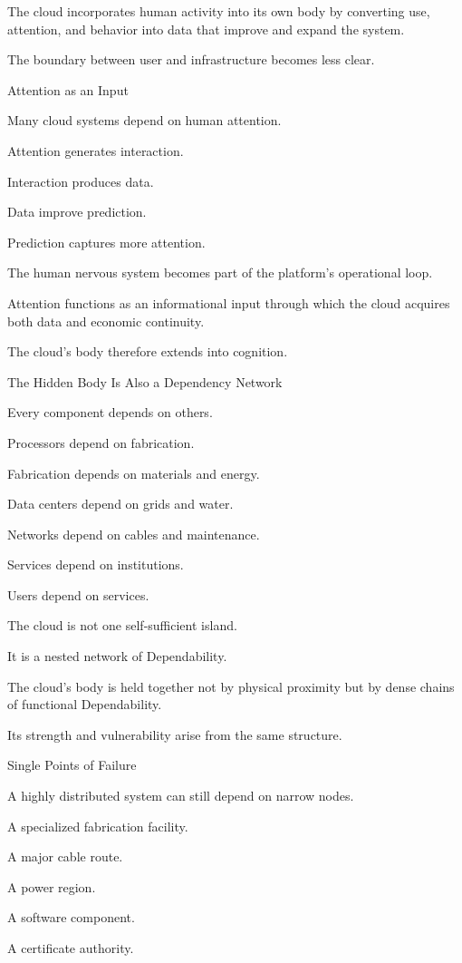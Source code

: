 The cloud incorporates human activity into its own body by converting use, attention, and behavior into data that improve and expand the system.

The boundary between user and infrastructure becomes less clear.

Attention as an Input

Many cloud systems depend on human attention.

Attention generates interaction.

Interaction produces data.

Data improve prediction.

Prediction captures more attention.

The human nervous system becomes part of the platform’s operational loop.

Attention functions as an informational input through which the cloud acquires both data and economic continuity.

The cloud’s body therefore extends into cognition.

The Hidden Body Is Also a Dependency Network

Every component depends on others.

Processors depend on fabrication.

Fabrication depends on materials and energy.

Data centers depend on grids and water.

Networks depend on cables and maintenance.

Services depend on institutions.

Users depend on services.

The cloud is not one self-sufficient island.

It is a nested network of Dependability.

The cloud’s body is held together not by physical proximity but by dense chains of functional Dependability.

Its strength and vulnerability arise from the same structure.

Single Points of Failure

A highly distributed system can still depend on narrow nodes.

A specialized fabrication facility.

A major cable route.

A power region.

A software component.

A certificate authority.

